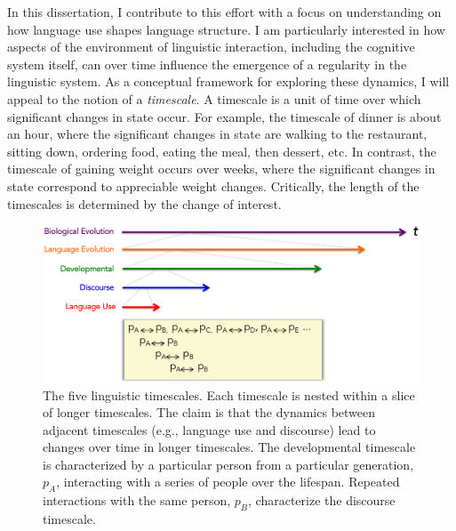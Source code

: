 In this dissertation, I contribute to this effort with a focus on understanding on how language use shapes language structure. I am particularly interested in how  aspects of the environment of linguistic interaction, including the cognitive system itself, can over time influence the emergence of a regularity in the linguistic system. As a conceptual framework for exploring these dynamics, I will appeal to the notion of a {\it timescale}. A timescale is a unit of time over which significant changes in state occur. For example, the timescale of dinner is about an hour, where the significant changes in state are walking to the restaurant, sitting down, ordering food, eating the meal, then dessert, etc. In contrast, the timescale of gaining weight occurs over weeks, where the significant changes in state correspond to appreciable weight changes. Critically, the length of the timescales is determined by the change of interest. 

\begin{figure}
\begin{center} 
\includegraphics[width=6in]{figs/timescales2}
\caption{The five linguistic timescales. Each timescale is nested within a slice of longer timescales. The claim is that the dynamics between adjacent timescales (e.g., language use and discourse) lead to changes over time in longer timescales. The developmental timescale is characterized by a particular person from a particular generation, $p_A$, interacting with a series of people over the lifespan. Repeated interactions with the same person, $p_B$, characterize the discourse timescale.}
\label{fig:timescales}
\end{center} 
\end{figure}



